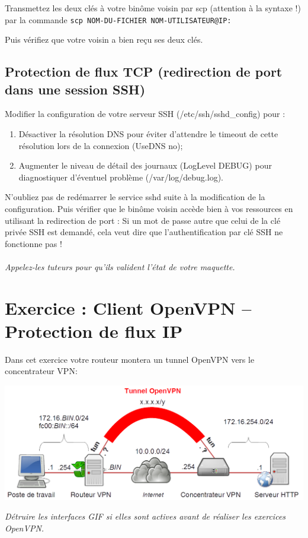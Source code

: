 \documentclass[a4paper,11pt]{article}
\newcommand{\shellcmd}[1]{\texttt{#1}}
\begin{document}
Transmettez les deux clés à votre binôme voisin par scp (attention à la syntaxe !) par la commande \shellcmd{scp~NOM-DU-FICHIER~NOM-UTILISATEUR@IP:}

Puis vérifiez que votre voisin a bien reçu ses deux clés.

\subsection{Protection de flux TCP (redirection de port dans une session SSH)}
Modifier la configuration de votre serveur SSH (/etc/ssh/sshd\_config) pour :
\begin{enumerate}
\item Désactiver la résolution DNS pour éviter d'attendre le timeout de cette résolution lors de la connexion (UseDNS no);
\item Augmenter le niveau de détail des journaux (LogLevel DEBUG) pour diagnostiquer d'éventuel problème (/var/log/debug.log).
\end{enumerate}
N'oubliez pas de redémarrer le service sshd suite à la modification de la configuration.
Puis vérifier que le binôme voisin accède bien à vos ressources en utilisant la redirection de port : Si un mot de passe autre que celui de la clé privée SSH est demandé, cela veut dire que l'authentification par clé SSH ne fonctionne pas !
\\\\\emph{Appelez-les tuteurs pour qu'ils valident l'état de votre maquette.}
\section{Exercice : Client OpenVPN – Protection de flux IP}
Dans cet exercice votre routeur montera un tunnel OpenVPN vers le concentrateur VPN:
\begin{center}
\includegraphics[width=\linewidth]{Tunnel-OpenVPN}
\end{center}
\emph{Détruire les interfaces GIF si elles sont actives avant de réaliser les exercices OpenVPN.}
\end{document}
